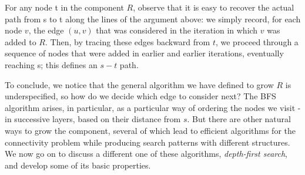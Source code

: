 \documentclass[12pt,a4paper]{book}
\begin{document}
For any node t in the component $R$, observe that it is easy to recover the actual path from s to t along the lines of the argument above: we simply record, for each node $v$, the edge $(u, v)$ that was considered in the iteration in which $v$ was added to $R$. Then, by tracing these edges backward from $t$, we proceed through a sequence of nodes that were added in earlier and earlier iterations, eventually reaching s; this defines an $s-t$ path.\par
To conclude, we notice that the general algorithm we have defined to grow $R$ is underspecified, so how do we decide which edge to consider next? The BFS algorithm arises, in particular, as a particular way of ordering the nodes we visit - in successive layers, based on their distance from $s$. But there are other natural ways to grow the component, several of which lead to efficient algorithms for the connectivity problem while producing search patterns with different structures. We now go on to discuss a different one of these algorithms, \textit{depth-first search}, and develop some of its basic properties.
\end{document}
